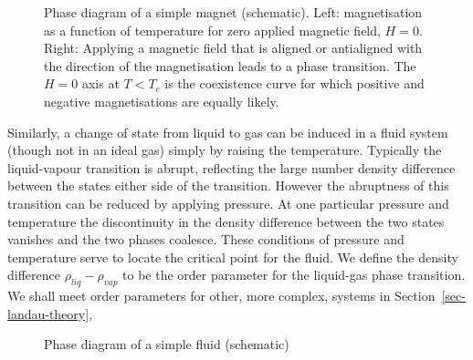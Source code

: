 \documentclass[
  letterpaper,
  enabledeprecatedfontcommands]{report}
\begin{document}
\begin{figure}


\caption{\label{fig-isingpd}Phase diagram of a simple magnet
(schematic). Left: magnetisation as a function of temperature for zero
applied magnetic field, \(H=0\). Right: Applying a magnetic field that
is aligned or antialigned with the direction of the magnetisation leads
to a phase transition. The \(H=0\) axis at \(T<T_c\) is the coexistence
curve for which positive and negative magnetisations are equally
likely.}

\end{figure}%

Similarly, a change of state from liquid to gas can be induced in a
fluid system (though not in an ideal gas) simply by raising the
temperature. Typically the liquid-vapour transition is abrupt,
reflecting the large number density difference between the states either
side of the transition. However the abruptness of this transition can be
reduced by applying pressure. At one particular pressure and temperature
the discontinuity in the density difference between the two states
vanishes and the two phases coalesce. These conditions of pressure and
temperature serve to locate the critical point for the fluid. We define
the density difference \(\rho_{liq}-\rho_{vap}\) to be the order
parameter for the liquid-gas phase transition. We shall meet order
parameters for other, more complex, systems in
Section~\ref{sec-landau-theory},

\begin{figure}


\caption{\label{fig-fluidpd}Phase diagram of a simple fluid (schematic)}

\end{figure}%
\end{document}
